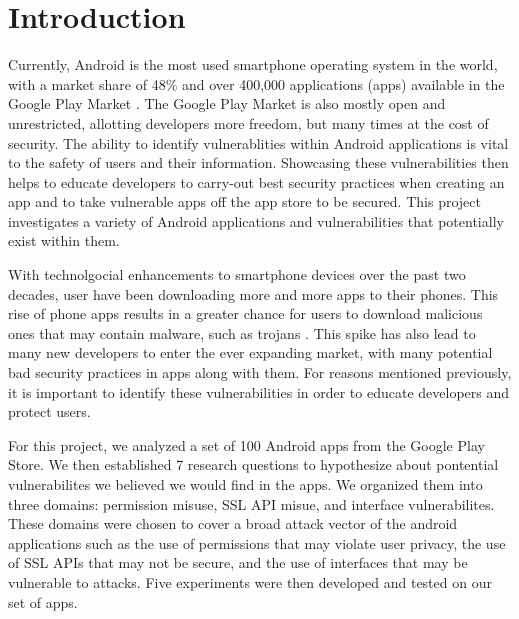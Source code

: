 \section{Introduction}




Currently, Android is the most used smartphone operating system in the world, with a market share of 48\% and over 400,000 applications (apps) available in the Google Play Market \cite{10.1145/2382196.2382205}. The Google Play
Market is also mostly open and unrestricted, allotting developers more freedom, but many times at the cost of security. 
The ability to identify vulnerablities within Android applications is vital to the safety of users and their information. Showcasing these vulnerabilities then
helps to educate developers to carry-out best security practices when creating an app and to take vulnerable apps off the app store to be secured. This project investigates a variety of Android applications and vulnerabilities that potentially 
exist within them. 

With technolgocial enhancements to smartphone devices over the past two decades, user have been downloading more and more apps to their phones. This rise of phone apps results in a greater chance for users to download malicious ones 
that may contain malware, such as trojans \cite{10.1145/1653662.1653691}. This spike has also lead to many new developers to enter the ever expanding market, with many potential bad security practices in apps along with them. For reasons mentioned previously, 
it is important to identify these vulnerabilities in order to educate developers and protect users. 

For this project, we analyzed a set of 100 Android apps from the Google Play Store. We then established 7 research questions to hypothesize about pontential vulnerabilites we believed we would find in the apps. We organized them into three domains: permission misuse, 
SSL API misue, and interface vulnerabilites. These domains were chosen to cover a broad attack vector of the android applications such as the use of permissions that may violate user privacy, the use of SSL APIs that may not be secure, and the use of interfaces that may be vulnerable to attacks.
Five experiments were then developed and tested on our set of apps. 

